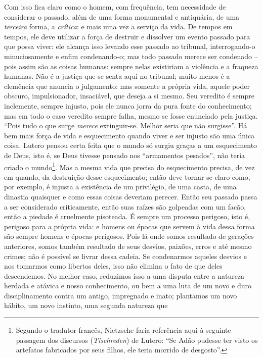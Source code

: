 Com isso fica claro como o homem, com frequência, tem necessidade de
considerar o passado, além de uma forma monumental e antiquária, de uma
\emph{terceira} forma, a \emph{crítica}: e mais uma vez a serviço da
vida. De tempos em tempos, ele deve utilizar a força de destruir e
dissolver um evento passado para que possa viver: ele alcança isso
levando esse passado ao tribunal, interrogando-o minuciosamente e enfim
condenando-o; mas todo passado merece ser condenado -- pois assim são as
coisas humanas: sempre nelas existiriam a violência e a fraqueza
humanas. Não é a justiça que se senta aqui no tribunal; muito menos é a
clemência que anuncia o julgamento: mas somente a própria vida, aquele
poder obscuro, impulsionador, insaciável, que deseja a si mesmo. Seu
veredito é sempre inclemente, sempre injusto, pois ele nunca jorra da
pura fonte do conhecimento; mas em todo o caso veredito sempre falha,
mesmo se fosse enunciado pela justiça. ``Pois tudo o que surge
\emph{merece} extinguir-se. Melhor seria que não surgisse''. Há bem mais
força de vida e esquecimento quando viver e ser injusto são uma única
coisa. Lutero pensou certa feita que o mundo só surgiu graças a um
esquecimento de Deus, isto é, se Deus tivesse pensado nos ``armamentos
pesados'', não teria criado o mundo\footnote{Segundo o tradutor francês,
  Nietzsche faria referência aqui à seguinte passagem dos discursos
  (\emph{Tischreden}) de Lutero: ``Se Adão pudesse ter visto os
  artefatos fabricados por seus filhos, ele teria morrido de desgosto''.}.
Mas a mesma vida que precisa do esquecimento precisa, de vez em quando,
da destruição desse esquecimento; então deve tornar-se claro como, por
exemplo, é injusta a existência de um privilégio, de uma casta, de uma
dinastia quaisquer e como essas coisas deveriam perecer. Então seu
passado passa a ser considerado criticamente, então suas raízes são
golpeadas com um facão, então a piedade é cruelmente pisoteada. É sempre
um processo perigoso, isto é, perigoso para a própria vida: e homens ou
épocas que servem à vida dessa forma são sempre homens e épocas
perigosos. Pois lá onde somos resultado de gerações anteriores, somos
também resultado de seus desvios, paixões, erros e até mesmo crimes; não
é possível se livrar dessa cadeia. Se condenarmos aqueles desvios e nos
tomarmos como libertos deles, isso não elimina o fato de que deles
descendemos. No melhor caso, reduzimos isso a uma disputa entre a
natureza herdada e atávica e nosso conhecimento, ou bem a uma luta de um
novo e duro disciplinamento contra um antigo, impregnado e inato;
plantamos um novo hábito, um novo instinto, uma segunda natureza que
